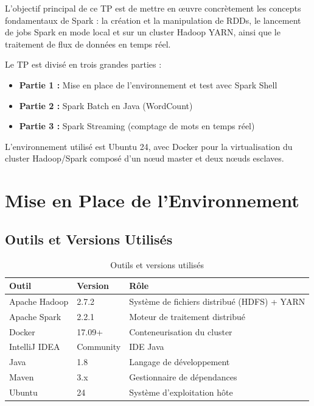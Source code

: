 \documentclass[12pt,a4paper]{report}
\begin{document}
L'objectif principal de ce TP est de mettre en œuvre concrètement les concepts fondamentaux de Spark : la création et la manipulation de RDDs, le lancement de jobs Spark en mode local et sur un cluster Hadoop YARN, ainsi que le traitement de flux de données en temps réel.

Le TP est divisé en trois grandes parties :
\begin{itemize}
  \item \textbf{Partie 1 :} Mise en place de l'environnement et test avec Spark Shell
  \item \textbf{Partie 2 :} Spark Batch en Java (WordCount)
  \item \textbf{Partie 3 :} Spark Streaming (comptage de mots en temps réel)
\end{itemize}

L'environnement utilisé est Ubuntu 24, avec Docker pour la virtualisation du cluster Hadoop/Spark composé d'un nœud master et deux nœuds esclaves.

\chapter{Mise en Place de l'Environnement}

\section{Outils et Versions Utilisés}

\begin{table}[H]
\centering
\begin{tabularx}{\textwidth}{|l|l|X|}
\hline
\rowcolor{bleuESP!20}
\textbf{Outil} & \textbf{Version} & \textbf{Rôle} \\
\hline
Apache Hadoop & 2.7.2 & Système de fichiers distribué (HDFS) + YARN \\
\hline
Apache Spark & 2.2.1 & Moteur de traitement distribué \\
\hline
Docker & 17.09+ & Conteneurisation du cluster \\
\hline
IntelliJ IDEA & Community & IDE Java \\
\hline
Java & 1.8 & Langage de développement \\
\hline
Maven & 3.x & Gestionnaire de dépendances \\
\hline
Ubuntu & 24 & Système d'exploitation hôte \\
\hline
\end{tabularx}
\caption{Outils et versions utilisés}
\end{table}
\end{document}
